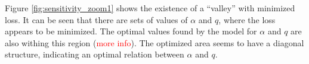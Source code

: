Figure \ref*{fig:sensitivity_zoom1} shows the existence of a ``valley'' with minimized loss. It can be seen that there are 
sets of values of $\alpha$ and $q$, where the loss appears to be minimized. The optimal values found by the model for $\alpha$
and $q$ are also withing this region (\textcolor{red}{more info}). The optimized area seems to have a diagonal structure,
indicating an optimal relation between $\alpha$ and $q$.

